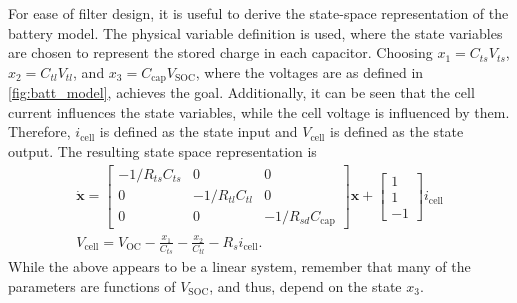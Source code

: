 For ease of filter design, it is useful to derive the state-space representation of the battery model. The physical variable definition is used, where the state variables are chosen to represent the stored charge in each capacitor. Choosing $x_1=C_{ts}V_{ts}$, $x_2=C_{tl}V_{tl}$, and $x_3=C_\text{cap}V_\text{SOC}$, where the voltages are as defined in \autoref{fig:batt_model}, achieves the goal. Additionally, it can be seen that the cell current influences the state variables, while the
cell voltage is influenced by them. Therefore, $i_\text{cell}$ is defined as the state input and $V_\text{cell}$ is defined as the state output. The resulting state space representation is
\begin{gather}
    \dot{\mathbf{x}} = \begin{bmatrix}
        -1/R_{ts}C_{ts} & 0 & 0 \\
        0 & -1/R_{tl}C_{tl} & 0 \\
        0 & 0 & -1/R_{sd}C_\text{cap}
    \end{bmatrix} \mathbf{x} + \begin{bmatrix} 1 \\ 1 \\ -1 \end{bmatrix} i_\text{cell} \\
    V_\text{cell} = V_\text{OC} - \frac{x_1}{C_{ts}} - \frac{x_2}{C_{tl}} - R_s i_\text{cell}.
\end{gather}
While the above appears to be a linear system, remember that many of the parameters are functions of $V_\text{SOC}$, and thus, depend on the state $x_3$.

